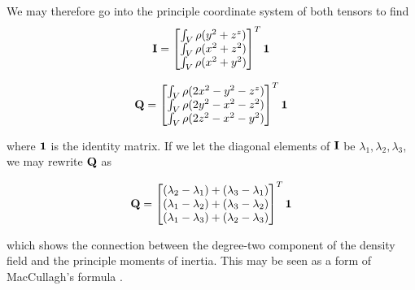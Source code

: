 \documentclass[extra]{gji}
\begin{document}
We may therefore go into the principle coordinate system of both tensors to find
\begin{equation}
{\bf I} = \begin{bmatrix}
\int_V \rho (y^2+z^z)\\
\int_V \rho (x^2+z^2) \\
\int_V \rho (x^2+y^2) 
\end{bmatrix}^T {\bf 1}
\end{equation}

\begin{equation}
{\bf Q} = \begin{bmatrix}
\int_V \rho (2 x^2 - y^2 - z^z)\\
\int_V \rho (2 y^2 - x^2 -z^2)\\
\int_V \rho (2 z^2 - x^2 - y^2) 
\end{bmatrix}^T {\bf 1}
\end{equation}

where $\bf 1$ is the identity matrix.  If we let the diagonal elements of $\bf I$ be $\lambda_1, \lambda_2, \lambda_3$, we may rewrite $\bf Q$ as

\begin{equation}
{\bf Q} = \begin{bmatrix}
(\lambda_2-\lambda_1) + (\lambda_3-\lambda_1)\\
(\lambda_1-\lambda_2) + (\lambda_3-\lambda_2)\\
(\lambda_1-\lambda_3) + (\lambda_2-\lambda_3)\\
\end{bmatrix}^T {\bf 1}
\label{maccullagh}
\end{equation}

which shows the connection between the degree-two component of the density field and the principle moments of inertia.  This may be seen as a form of MacCullagh's formula \citep{stacey1977physics}.

\label{lastpage}
\end{document}
